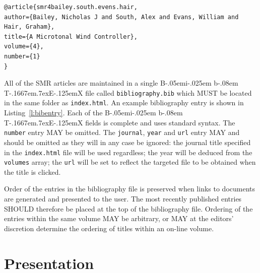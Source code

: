 \documentclass[a4paper,10pt]{SMR}
\def\BibTeX{{\rm B\kern-.05em{\sc i\kern-.025em b}\kern-.08em
    T\kern-.1667em\lower.7ex\hbox{E}\kern-.125emX}}
\begin{document}
\begin{lstlisting}
@article{smr4bailey.south.evens.hair,
author={Bailey, Nicholas J and South, Alex and Evans, William and Hair, Graham},
title={A Microtonal Wind Controller},
volume={4},
number={1}
}
\end{lstlisting}
All of the SMR articles are maintained in a single \BibTeX{}
file called \texttt{bibliography.bib} which MUST be located in
the same folder as \texttt{index.html}. An example bibliography
entry is shown in Listing~\ref{l:bibentry}. Each of the \BibTeX{}
fields is complete and uses standard syntax. The \texttt{number}
entry MAY be omitted. The \texttt{journal}, \texttt{year} and \texttt{url}
entry MAY and should be omitted as they will in any case be ignored:
the journal title specified in the \texttt{index.html} file
will be used regardless; the year will be deduced from the
\texttt{volumes} array; the \texttt{url} will be set to reflect
the targeted file to be obtained when the title is clicked. 

Order of the entries in the bibliography file is preserved when
links to documents are generated and presented to the user.
The most recently published entries SHOULD therefore be placed
at the top of the bibliography file. Ordering of the entries
within the same volume MAY be arbitrary, or MAY at the editors'
discretion determine the ordering of titles within an on-line
volume.

\section{Presentation}
\end{document}
